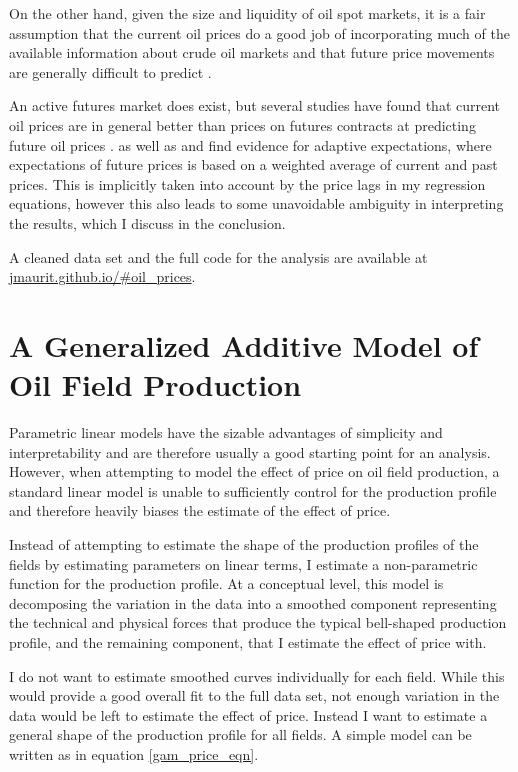 \documentclass[12pt]{article}
\begin{document}
On the other hand, given the size and liquidity of oil spot markets, it is a fair assumption that the current oil prices do a good job of incorporating much of the available information about crude oil markets and that future price movements are generally difficult to predict \citep{hamilton_understanding_2008}.

An active futures market does exist, but several studies have found that current oil prices are in general better than prices on futures contracts at predicting future oil prices \citep{alquist_what_2010, chinn_predictive_2005}.  \citet{mohn_investment_2008} as well as \citet{pesaran_econometric_1990} and \citet{farzin_impact_2001} find evidence for adaptive expectations, where expectations of future prices is based on a weighted average of current and past prices. This is implicitly taken into account by the price lags in my regression equations, however this also leads to some unavoidable ambiguity in interpreting the results, which I discuss in the conclusion. 

A cleaned data set and the full code for the analysis are available at \url{jmaurit.github.io/#oil_prices}.

\section{A Generalized Additive Model of Oil Field Production}
Parametric linear models have the sizable advantages of simplicity and interpretability and are therefore usually a good starting point for an analysis. However, when attempting to model the effect of price on oil field production, a standard linear model is unable to sufficiently control for the production profile and therefore heavily biases the estimate of the effect of price.
  
Instead of attempting to estimate the shape of the production profiles of the fields by estimating parameters on linear terms, I estimate a non-parametric function for the production profile. At a conceptual level, this model is decomposing the variation in the data into a smoothed component representing the technical and physical forces that produce the typical bell-shaped production profile, and the remaining component, that I estimate the effect of price with.  

I do not want to estimate smoothed curves individually for each field. While this would provide a good overall fit to the full data set, not enough variation in the data would be left to estimate the effect of price.  Instead I want to estimate a general shape of the production profile for all fields. A simple model can be written as in equation \ref{gam_price_eqn}. 
\end{document}
